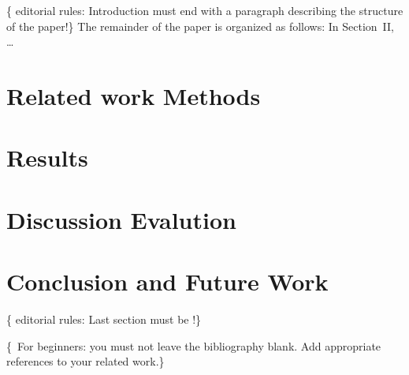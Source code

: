 \documentclass[conference,flushend]{iaria-lite}
\begin{document}
\{\faWarning{}  editorial rules: Introduction must end with a paragraph describing the structure of the paper!\}
The remainder of the paper is organized as follows: In Section~II, …

\section{Related work \textbar{} Methods}
\lipsum[13]

\section{Results}
\lipsum[14]

\section{Discussion \textbar{} Evalution}
\lipsum[15]

\section{Conclusion and Future Work}
\{\faWarning{}  editorial rules: Last section must be !\}
\lipsum[16]

\{\,\faWarning{} For beginners: you must not leave the bibliography blank. Add appropriate references to your related work.\}

\begingroup
\sloppy
\printbibliography
\endgroup 
\end{document}
